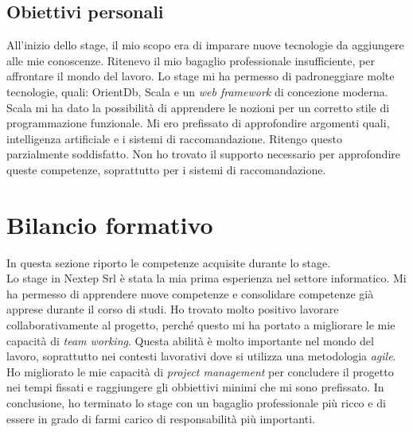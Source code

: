 \subsection{Obiettivi personali}
All'inizio dello stage, il mio scopo era di imparare nuove tecnologie da aggiungere alle mie conoscenze. Ritenevo il mio bagaglio professionale insufficiente, per affrontare il mondo del lavoro. Lo stage mi ha permesso di padroneggiare molte tecnologie, quali: OrientDb, Scala e un \emph{web \gls{framework}} di concezione moderna. Scala mi ha dato la possibilità di apprendere le nozioni per un corretto stile di programmazione funzionale. Mi ero prefissato di approfondire argomenti quali, intelligenza artificiale e i sistemi di raccomandazione. Ritengo questo parzialmente soddisfatto. Non ho trovato il supporto necessario per approfondire queste competenze, soprattutto per i sistemi di raccomandazione.




\section{Bilancio formativo}
In questa sezione riporto le competenze acquisite durante lo stage.\\
Lo stage in Nextep Srl è stata la  mia prima esperienza nel settore informatico. Mi ha permesso di apprendere nuove competenze e consolidare competenze già apprese durante il corso di studi.
Ho trovato molto positivo lavorare collaborativamente al progetto, perché questo mi ha portato a migliorare le mie capacità di \emph{team working}. Questa abilità è molto importante nel mondo del lavoro, soprattutto nei contesti lavorativi dove si utilizza una metodologia \emph{agile}. Ho migliorato le mie capacità di \emph{project management} per concludere il progetto nei tempi fissati e raggiungere gli obbiettivi minimi che mi sono prefissato. In conclusione, ho terminato lo stage con un bagaglio professionale più ricco e di essere in grado di farmi carico di responsabilità più importanti.
\newpage
